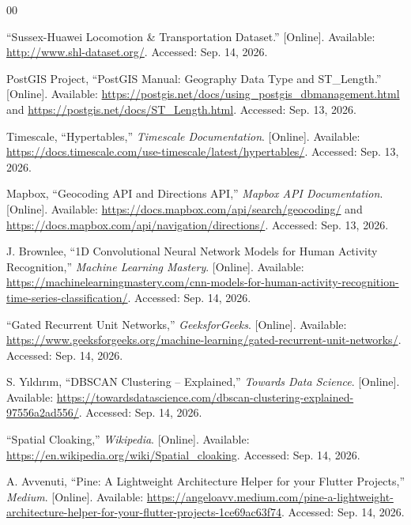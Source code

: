\documentclass[conference]{IEEEtran}
\begin{document}
\balance
\begin{thebibliography}{00}

``Sussex-Huawei Locomotion \& Transportation Dataset.'' [Online].
Available: \url{http://www.shl-dataset.org/}. Accessed: Sep. 14, 2026.

PostGIS Project, ``PostGIS Manual: Geography Data Type and
ST\_Length.'' [Online]. Available:
\url{https://postgis.net/docs/using_postgis_dbmanagement.html} and
\url{https://postgis.net/docs/ST_Length.html}. Accessed: Sep. 13, 2026.

Timescale, ``Hypertables,'' \emph{Timescale Documentation}. [Online].
Available: \url{https://docs.timescale.com/use-timescale/latest/hypertables/}.
Accessed: Sep. 13, 2026.

Mapbox, ``Geocoding API and Directions API,'' \emph{Mapbox API
Documentation}. [Online]. Available:
\url{https://docs.mapbox.com/api/search/geocoding/} and
\url{https://docs.mapbox.com/api/navigation/directions/}.
Accessed: Sep. 13, 2026.

J. Brownlee, ``1D Convolutional Neural Network Models for Human
Activity Recognition,'' \emph{Machine Learning Mastery}. [Online].
Available:
\url{https://machinelearningmastery.com/cnn-models-for-human-activity-recognition-time-series-classification/}.
Accessed: Sep. 14, 2026.

``Gated Recurrent Unit Networks,'' \emph{GeeksforGeeks}. [Online].
Available:
\url{https://www.geeksforgeeks.org/machine-learning/gated-recurrent-unit-networks/}.
Accessed: Sep. 14, 2026.

S. Yıldırım, ``DBSCAN Clustering -- Explained,'' \emph{Towards Data
Science}. [Online]. Available:
\url{https://towardsdatascience.com/dbscan-clustering-explained-97556a2ad556/}.
Accessed: Sep. 14, 2026.

``Spatial Cloaking,'' \emph{Wikipedia}. [Online]. Available:
\url{https://en.wikipedia.org/wiki/Spatial_cloaking}. Accessed:
Sep. 14, 2026.

A. Avvenuti, ``Pine: A Lightweight Architecture Helper for your
Flutter Projects,'' \emph{Medium}. [Online]. Available:
\url{https://angeloavv.medium.com/pine-a-lightweight-architecture-helper-for-your-flutter-projects-1ce69ac63f74}.
Accessed: Sep. 14, 2026.

\end{thebibliography}
\end{document}
